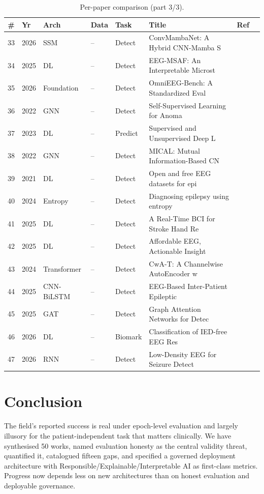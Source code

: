 \documentclass[10pt,journal,twocolumn]{IEEEtran}
\begin{document}
\begin{table}[t]\centering\caption{Per-paper comparison (part 3/3).}
\footnotesize\begin{tabular}{clllll p{2.4cm}l}\toprule \# & Yr & Arch & Data & Task & Title & Ref\\\midrule
33 & 2026 & SSM & -- & Detect & ConvMambaNet: A Hybrid CNN-Mamba S & \cite{ep260113234} \\
34 & 2025 & DL & -- & Detect & EEG-MSAF: An Interpretable Microst & \cite{ep250902568} \\
35 & 2026 & Foundation & -- & Detect & OmniEEG-Bench: A Standardized Eval & \cite{ep260600815} \\
36 & 2022 & GNN & -- & Detect & Self-Supervised Learning for Anoma & \cite{ep220807448} \\
37 & 2023 & DL & -- & Predict & Supervised and Unsupervised Deep L & \cite{ep230414922} \\
38 & 2022 & GNN & -- & Detect & MICAL: Mutual Information-Based CN & \cite{ep220602298} \\
39 & 2021 & DL & -- & Detect & Open and free EEG datasets for epi & \cite{ep210801030} \\
40 & 2024 & Entropy & -- & Detect & Diagnosing epilepsy using entropy  & \cite{ep240107258} \\
41 & 2025 & DL & -- & Detect & A Real-Time BCI for Stroke Hand Re & \cite{ep251015890} \\
42 & 2025 & DL & -- & Detect & Affordable EEG, Actionable Insight & \cite{ep251101879} \\
43 & 2024 & Transformer & -- & Detect & CwA-T: A Channelwise AutoEncoder w & \cite{ep241214522} \\
44 & 2025 & CNN-BiLSTM & -- & Detect & EEG-Based Inter-Patient Epileptic  & \cite{ep250515203} \\
45 & 2025 & GAT & -- & Detect & Graph Attention Networks for Detec & \cite{ep250715118} \\
46 & 2026 & DL & -- & Biomark & Classification of IED-free EEG Res & \cite{ep260522858} \\
47 & 2026 & RNN & -- & Detect & Low-Density EEG for Seizure Detect & \cite{ep260611970} \\
\bottomrule\end{tabular}\end{table}









\section{Conclusion}
The field's reported success is real under epoch-level evaluation and largely illusory for the patient-independent task that matters clinically. We have synthesised 50 works, named evaluation honesty as the central validity threat, quantified it, catalogued fifteen gaps, and specified a governed deployment architecture with Responsible/Explainable/Interpretable AI as first-class metrics. Progress now depends less on new architectures than on honest evaluation and deployable governance.

\small
\end{document}
